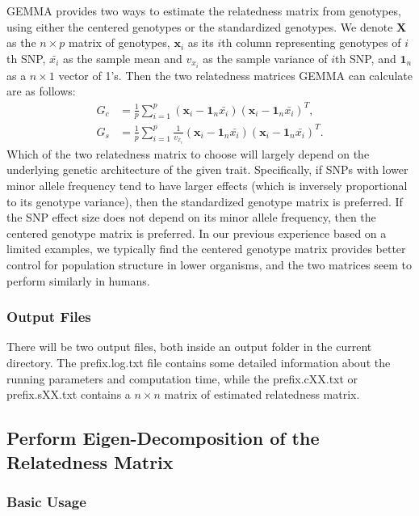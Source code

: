 \documentclass[11pt]{article}
\begin{document}
GEMMA provides two ways to estimate the relatedness matrix from
genotypes, using either the centered genotypes or the standardized
genotypes. We denote $\mathbf X$ as the $n\times p$ matrix of
genotypes, $\mathbf x_i$ as its $i$th column representing genotypes of
$i$th SNP, $\bar{x_i}$ as the sample mean and $v_{x_i}$ as the sample
variance of $i$th SNP, and $\mathbf 1_n$ as a $n\times 1$ vector of
1's. Then the two relatedness matrices GEMMA can calculate are as
follows:
%
\begin{align*}
G_c&=\frac{1}{p}\sum_{i=1}^p
(\mathbf x_i-\mathbf 1_n \bar{x_i})(\mathbf x_i-\mathbf 1_n \bar{x_i})^T, \\
G_s&=\frac{1}{p}\sum_{i=1}^p
\frac{1}{v_{x_i}}(\mathbf x_i-\mathbf 1_n \bar{x_i})
(\mathbf x_i-\mathbf 1_n \bar{x_i})^T.
\end{align*}
%
Which of the two relatedness matrix to choose will largely depend on
the underlying genetic architecture of the given trait. Specifically,
if SNPs with lower minor allele frequency tend to have larger effects
(which is inversely proportional to its genotype variance), then the
standardized genotype matrix is preferred. If the SNP effect size does
not depend on its minor allele frequency, then the centered genotype
matrix is preferred. In our previous experience based on a limited
examples, we typically find the centered genotype matrix provides
better control for population structure in lower organisms, and the
two matrices seem to perform similarly in humans.

\subsubsection{Output Files}

There will be two output files, both inside an output folder in the
current directory. The prefix.log.txt file contains some detailed
information about the running parameters and computation time, while
the prefix.cXX.txt or prefix.sXX.txt contains a $n\times n$ matrix of
estimated relatedness matrix.

\subsection{Perform Eigen-Decomposition of the Relatedness Matrix}

\subsubsection{Basic Usage}
\end{document}
